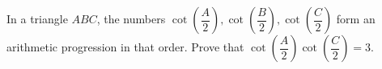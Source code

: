 In a triangle $ABC$, the numbers $\cot(\dfrac{A}{2}),\cot(\dfrac{B}{2}),\cot(\dfrac{C}{2})$ form an arithmetic progression in that order. Prove that $\cot(\dfrac{A}{2})\cot(\dfrac{C}{2})=3$.
